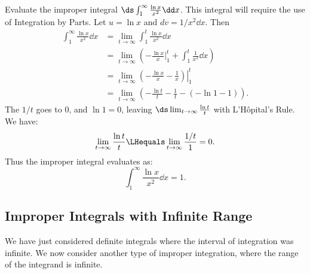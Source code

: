 \begin{example}\label{ex_impint2}%
Evaluate the improper integral $\ds \int_1^\infty \frac{\ln x}{x^2}\dd x$.
\solution
This integral will require the use of Integration by Parts. Let $u = \ln x$ and $dv = 1/x^2\dd x$. Then
%
%
\begin{align*}
	\int_1^\infty\frac{\ln x}{x^2}\dd x
	&= \lim_{t\to\infty}\int_1^t\frac{\ln x}{x^2}\dd x \\
	&=  \lim_{t\to\infty}\left(-\frac{\ln x}{x}\Big|_1^t +\int_1^t \frac{1}{x^2}\dd x \right)\\
	&=  \lim_{t\to\infty} \left.\left(-\frac{\ln x}{x} -\frac1x\right)\right|_1^t\\
	&=	\lim_{t\to\infty} \left(-\frac{\ln t}{t}-\frac1t - \left(-\ln 1-1\right)\right).
\end{align*}
The $1/t$ goes to 0, and $\ln 1=0$, leaving
$\ds \lim_{t\to\infty} \frac{\ln t}{t}$ with L'Hôpital's Rule. We have:
\[\lim_{t\to\infty}\frac{\ln t}t \LHequals \lim_{t\to\infty} \frac{1/t}{1} = 0.\]
Thus the improper integral evaluates as:
\[\int_1^\infty\frac{\ln x}{x^2}\dd x = 1.\]
\end{example}

\subsection{Improper Integrals with Infinite Range}

We have just considered definite integrals where the interval of integration was infinite. We now consider another type of improper integration, where the range of the integrand is infinite.

